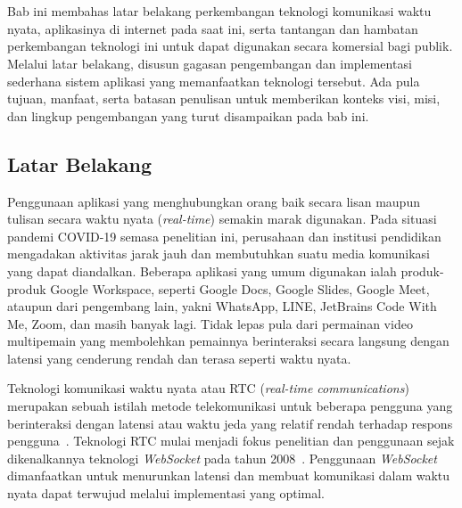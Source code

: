 \chapter{\babSatu}
\label{bab:1}
Bab ini membahas latar belakang perkembangan teknologi komunikasi waktu nyata, aplikasinya di internet pada saat ini, serta tantangan dan hambatan perkembangan teknologi ini untuk dapat digunakan secara komersial bagi publik. Melalui latar belakang, disusun gagasan pengembangan dan implementasi sederhana sistem aplikasi yang memanfaatkan teknologi tersebut. Ada pula tujuan, manfaat, serta batasan penulisan untuk memberikan konteks visi, misi, dan lingkup pengembangan yang turut disampaikan pada bab ini.



\section{Latar Belakang}
\label{sec:latarBelakang}
Penggunaan aplikasi yang menghubungkan orang baik secara lisan maupun tulisan secara waktu nyata (\textit{real-time}) semakin marak digunakan. Pada situasi pandemi COVID-19 semasa penelitian ini, perusahaan dan institusi pendidikan mengadakan aktivitas jarak jauh dan membutuhkan suatu media komunikasi yang dapat diandalkan. Beberapa aplikasi yang umum digunakan ialah produk-produk Google Workspace, seperti Google Docs, Google Slides, Google Meet, ataupun dari pengembang lain, yakni WhatsApp, LINE, JetBrains Code With Me, Zoom, dan masih banyak lagi. Tidak lepas pula dari permainan video multipemain yang membolehkan pemainnya berinteraksi secara langsung dengan latensi yang cenderung rendah dan terasa seperti waktu nyata.

Teknologi komunikasi waktu nyata atau RTC (\textit{real-time communications}) merupakan sebuah istilah metode telekomunikasi untuk beberapa pengguna yang berinteraksi dengan latensi atau waktu jeda yang relatif rendah terhadap respons pengguna~\citep{arefin2013modified}. Teknologi RTC mulai menjadi fokus penelitian dan penggunaan sejak dikenalkannya teknologi \textit{WebSocket} pada tahun 2008~\citep{fette2011websocket, reynolds2008web}. Penggunaan \textit{WebSocket} dimanfaatkan untuk menurunkan latensi dan membuat komunikasi dalam waktu nyata dapat terwujud melalui implementasi yang optimal.

